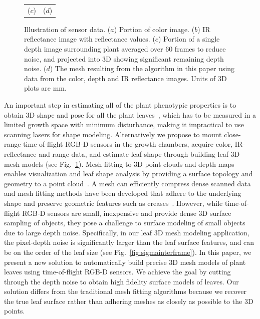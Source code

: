 \begin{figure}
\begin{center}
\begin{tabular}{ c c }
($c$) & ($d$) \\
\end{tabular}
\end{center}
\caption{Illustration of sensor data.  ($a$) Portion of color image. ($b$) IR reflectance image with reflectance values. ($c$) Portion of a single depth image surrounding plant averaged over 60 frames to reduce noise, and projected into $3$D showing significant remaining depth noise. ($d$)  The mesh resulting from the algorithm in this paper using data from the color, depth and IR reflectance images.  Units of $3$D plots are mm.  }
\label{fig:plantnoise}
\end{figure}



An important step in estimating all of the plant phenotypic properties is to obtain $3$D shape and pose for all the plant leaves~\cite{muller2015leaf}, which has to be measured in a limited growth space with minimum disturbance, making it impractical to use scanning lasers for shape modeling. Alternatively we propose to mount close-range time-of-flight RGB-D sensors in the growth chambers, acquire color, IR-reflectance and range data, and estimate leaf shape through building leaf $3$D mesh models (see Fig.~\ref{fig:plantnoise}). Mesh fitting to $3$D point clouds and depth maps enables visualization and leaf shape analysis by providing a surface topology and geometry to a point cloud~\cite{Sienz2000,Yeh2011}.  A mesh can efficiently compress dense scanned data and mesh fitting methods have been developed that adhere to the underlying shape and preserve geometric features such as creases~\cite{hoppe:1994,Kobbelt:1998}. 
%
However, while time-of-flight RGB-D sensors are small, inexpensive and provide dense $3$D surface sampling of objects, they pose a challenge to surface modeling of small objects due to large depth noise. Specifically, in our leaf $3$D mesh modeling application, the pixel-depth noise is significantly larger than the leaf surface features, and can be on the order of the leaf size (see Fig.~\ref{fig:sigmainterframe}). In this paper, we present a new solution to automatically build precise $3$D mesh models of plant leaves using time-of-flight RGB-D sensors. We achieve the goal by cutting through the depth noise to obtain high fidelity surface models of leaves. Our solution differs from the traditional mesh fitting algorithms because we recover the true leaf surface rather than adhering meshes as closely as possible to the 3D points.



